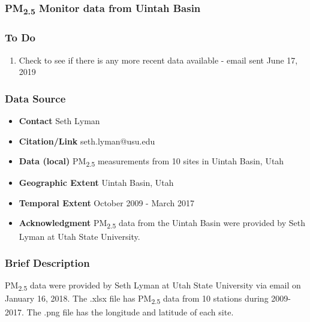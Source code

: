 \subsubsection{\texorpdfstring{PM\textsubscript{2.5}}{} Monitor data from Uintah Basin}

\subsubsection*{To Do}
\begin{enumerate}
\item Check to see if there is any more recent data available - email sent June 17, 2019
\end{enumerate}

\subsubsection*{Data Source}

\begin{itemize}[nolistsep]
\item \textbf{Contact} Seth Lyman 
\item \textbf{Citation/Link} seth.lyman@usu.edu
\item \textbf{Data (local)} PM\textsubscript{2.5} measurements from 10 sites in Uintah Basin, Utah
\item \textbf{Geographic Extent} Uintah Basin, Utah
\item \textbf{Temporal Extent} October 2009 - March 2017
\item \textbf{Acknowledgment} PM\textsubscript{2.5} data from the Uintah Basin were provided by Seth Lyman at Utah State University.
\end{itemize}

\subsubsection*{Brief Description}

PM\textsubscript{2.5} data were provided by Seth Lyman at Utah State University via email on January 16, 2018. The .xlsx file has PM\textsubscript{2.5} data from 10 stations during 2009-2017. The .png file has the longitude and latitude of each site. 

